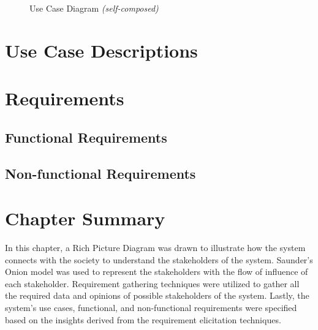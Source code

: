 \begin{figure}[h!]
\centering
{}
\caption{Use Case Diagram \textit{(self-composed)}}
\label{fig:use-case-diagram}
\end{figure}


\section{Use Case Descriptions}

\section{Requirements}

\subsection{Functional Requirements}

\subsection{Non-functional Requirements}

\section{Chapter Summary}
In this chapter, a Rich Picture Diagram was drawn to illustrate how the system connects with the society to understand the stakeholders of the system. Saunder's Onion model was used to represent the stakeholders with the flow of influence of each stakeholder. Requirement gathering techniques were utilized to gather all the required data and opinions of possible stakeholders of the system. Lastly, the system's use cases, functional, and non-functional requirements were specified based on the insights derived from the requirement elicitation techniques.